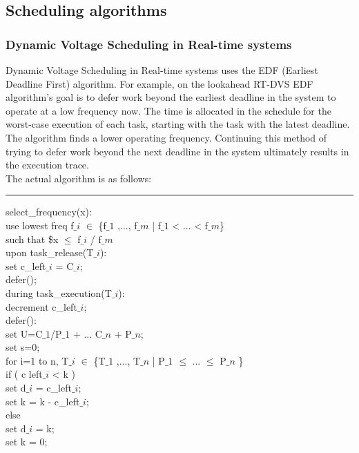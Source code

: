 \documentclass[conference]{IEEEtran}
\begin{document}
\subsection{Scheduling algorithms}
\subsubsection{Dynamic Voltage Scheduling in Real-time systems}
 Dynamic Voltage Scheduling in Real-time systems uses the EDF (Earliest Deadline First) algorithm. For example, on \cite{PADM01} the lookahead RT-DVS EDF algorithm's goal is to defer work beyond the earliest deadline in the system to operate at a low frequency now. The time is allocated in the schedule for the worst-case execution of each task, starting with the task with the latest deadline. The algorithm finds a lower operating frequency. Continuing this method of trying to defer work beyond the next deadline in the system ultimately results in the execution trace.\\
The actual algorithm is as follows:

\noindent\rule{8cm}{0.4pt}

select\_frequency(x):\\
	use lowest freq  f$\_{i}$ $\in$ \{f$\_{1}$ ,..., f$\_{m}$ | f$\_{1}$ < ... < f$\_{m}$\}\\
	such that \$x $\leq$ f$\_{i}$ / f$\_{m}$\\
	
upon task\_release(T$\_{i}$):\\
	set c\_left$\_{i}$ = C$\_{i}$;\\
	defer();\\

during task\_execution(T$\_{i}$):\\
	decrement c\_left$\_{i}$;\\
	
defer():\\
	set U=C$\_{1}$/P$\_{1}$ + ... C$\_{n}$ + P$\_{n}$;\\
	set s=0;\\
	for i=1 to n, T$\_{i}$ $\in$ \{T$\_{1}$ ,..., T$\_{n}$ | P$\_{1}$ $\leq$ ... $\leq$ P$\_{n}$ \} \\
		if ( c left$\_{i}$  < k )\\
			set d$\_{i}$  = c\_left$\_{i}$;\\
			set k = k - c\_left$\_{i}$;\\
		else\\
			set d$\_{i}$  = k;\\
			set k = 0;\\
		
\end{document}
